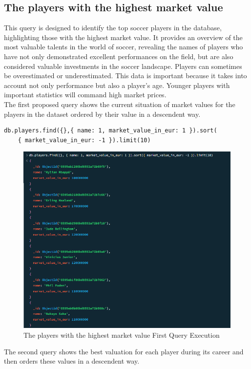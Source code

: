 \documentclass{Configuration_Files/PoliMi3i_thesis}
\begin{document}
\subsection{The players with the highest market value}
This query is designed to identify the top soccer players in the database, highlighting those with the highest market value. It provides an overview of the most valuable talents in the world of soccer, revealing the names of players who have not only demonstrated excellent performances on the field, but are also considered valuable investments in the soccer landscape. Players can sometimes be overestimated or underestimated. This data is important because it takes into account not only performance but also a player's age. Younger players with important statistics will command high market prices.
\\The first proposed query shows the current situation of market values for the players in the dataset ordered by their value in a descendent way.
\begin{verbatim}
db.players.find({},{ name: 1, market_value_in_eur: 1 }).sort(
    { market_value_in_eur: -1 }).limit(10)
\end{verbatim}
\begin{figure}[htbp]
    \centering
    \includegraphics[scale=0.8]{Images/Queries/Highest_value_players/1.png}
    \caption{The players with the highest market value First Query Execution}
\end{figure}
The second query shows the best valuation for each player during its career and then orders these values in a descendent way.
\end{document}
